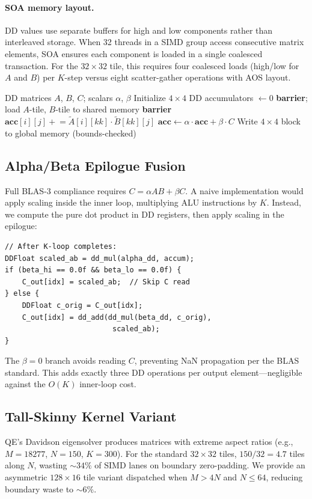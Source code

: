 \documentclass[conference]{IEEEtran}
\newcommand{\DGEMM}{\texttt{DGEMM}}
\begin{document}
\paragraph{SOA memory layout.} DD values use separate buffers for high and low components rather than interleaved storage. When 32 threads in a SIMD group access consecutive matrix elements, SOA ensures each component is loaded in a single coalesced transaction. For the $32 \times 32$ tile, this requires four coalesced loads (high/low for $A$ and $B$) per $K$-step versus eight scatter-gather operations with AOS layout.
\begin{algorithm}[t]
\caption{DD-\DGEMM{} kernel structure (per thread).}
\label{alg:dgemm}
\begin{algorithmic}[1]
\Require DD matrices $A$, $B$, $C$; scalars $\alpha$, $\beta$
\State Initialize $4 \times 4$ DD accumulators $\gets 0$
    \State \textbf{barrier}; load $A$-tile, $B$-tile to shared memory
    \State \textbf{barrier}
            \State $\mathbf{acc}[i][j] \mathrel{+}= \tilde{A}[i][kk] \cdot \tilde{B}[kk][j]$ 
        \EndFor
    \EndFor
\EndFor
\State $\mathbf{acc} \gets \alpha \cdot \mathbf{acc} + \beta \cdot C$ 
\State Write $4 \times 4$ block to global memory (bounds-checked)
\end{algorithmic}
\end{algorithm}
\subsection{Alpha/Beta Epilogue Fusion}
\label{sec:epilogue}
Full BLAS-3 compliance requires $C = \alpha AB + \beta C$. A naive implementation would apply scaling inside the inner loop, multiplying ALU instructions by $K$. Instead, we compute the pure dot product in DD registers, then apply scaling in the epilogue:
%
\begin{lstlisting}[style=metal]
// After K-loop completes:
DDFloat scaled_ab = dd_mul(alpha_dd, accum);
if (beta_hi == 0.0f && beta_lo == 0.0f) {
    C_out[idx] = scaled_ab;  // Skip C read
} else {
    DDFloat c_orig = C_out[idx];
    C_out[idx] = dd_add(dd_mul(beta_dd, c_orig),
                         scaled_ab);
}
\end{lstlisting}
%
The $\beta = 0$ branch avoids reading $C$, preventing NaN propagation per the BLAS standard. This adds exactly three DD operations per output element---negligible against the $O(K)$ inner-loop cost.
\subsection{Tall-Skinny Kernel Variant}
QE's Davidson eigensolver produces matrices with extreme aspect ratios (e.g., $M{=}18277$, $N{=}150$, $K{=}300$). For the standard $32{\times}32$ tiles, $150/32 = 4.7$ tiles along $N$, wasting ${\sim}34\%$ of SIMD lanes on boundary zero-padding. We provide an asymmetric $128{\times}16$ tile variant dispatched when $M > 4N$ and $N \leq 64$, reducing boundary waste to ${\sim}6\%$.
\end{document}
